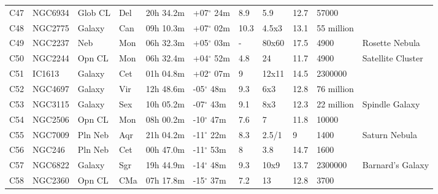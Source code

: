 \documentclass[10pt,twoside,a4paper,english]{article}
\begin{document}
\begin{longtable}{@{}lllllllllll@{}}
C47        & NGC6934     & Glob CL    & Del       & 20h 34.2m & +07$^{\circ}$ 24m  & 8.9       & 5.9                  & 12.7     & 57000               &                                 \\ 
C48        & NGC2775     & Galaxy     & Can       & 09h 10.3m & +07$^{\circ}$ 02m  & 10.3      & 4.5x3                & 13.1     & 55 million          &                                 \\ 
C49        & NGC2237    & Neb        & Mon       & 06h 32.3m & +05$^{\circ}$ 03m  & -         & 80x60                & 17.5     & 4900                & Rosette Nebula                  \\ 
C50        & NGC2244     & Opn CL     & Mon       & 06h 32.4m & +04$^{\circ}$ 52m  & 4.8       & 24                   & 11.7     & 4900                & Satellite Cluster               \\ 
C51        & IC1613      & Galaxy     & Cet       & 01h 04.8m & +02$^{\circ}$ 07m  & 9         & 12x11                & 14.5     & 2300000             &                                 \\ 
C52        & NGC4697     & Galaxy     & Vir       & 12h 48.6m & -05$^{\circ}$ 48m  & 9.3       & 6x3                  & 12.8     & 76 million          &                                 \\ 
C53        & NGC3115     & Galaxy     & Sex       & 10h 05.2m & -07$^{\circ}$ 43m  & 9.1       & 8x3                  & 12.3     & 22 million          & Spindle Galaxy                  \\ 
C54        & NGC2506     & Opn CL     & Mon       & 08h 00.2m & -10$^{\circ}$ 47m  & 7.6       & 7                    & 11.8     & 10000               &                                 \\ 
C55        & NGC7009     & Pln Neb    & Aqr       & 21h 04.2m & -11$^{\circ}$ 22m  & 8.3       & 2.5/1                & 9        & 1400                & Saturn Nebula                   \\ 
C56        & NGC246      & Pln Neb    & Cet       & 00h 47.0m & -11$^{\circ}$ 53m  & 8         & 3.8                  & 14.7     & 1600                &                                 \\ 
C57        & NGC6822     & Galaxy     & Sgr       & 19h 44.9m & -14$^{\circ}$ 48m  & 9.3       & 10x9                 & 13.7     & 2300000             & Barnard's Galaxy                \\ 
C58        & NGC2360     & Opn CL     & CMa       & 07h 17.8m & -15$^{\circ}$ 37m  & 7.2       & 13                   & 12.8     & 3700                &                                 \\ 

\end{longtable}
\end{document}
